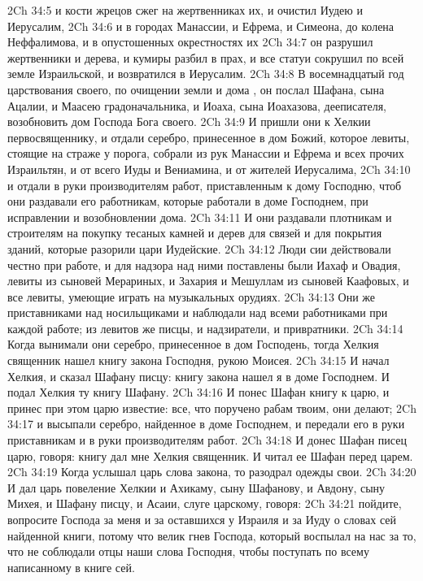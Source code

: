 \vs 2Ch 34:5 и кости жрецов сжег на жертвенниках их, и очистил Иудею и Иерусалим,
\vs 2Ch 34:6 и в городах Манассии, и Ефрема, и Симеона,  до колена Неффалимова, и в опустошенных окрестностях их
\vs 2Ch 34:7 он разрушил жертвенники и  дерева, и кумиры разбил в прах, и все статуи сокрушил по всей земле Израильской, и возвратился в Иерусалим.
\rsbpar\vs 2Ch 34:8 В восемнадцатый год царствования своего, по очищении земли и дома , он послал Шафана, сына Ацалии, и Маасею градоначальника, и Иоаха, сына Иоахазова, дееписателя, возобновить дом Господа Бога своего.
\vs 2Ch 34:9 И пришли они к Хелкии первосвященнику, и отдали серебро, принесенное в дом Божий, которое левиты, стоящие на страже у порога, собрали из рук Манассии и Ефрема и всех прочих Израильтян, и от всего Иуды и Вениамина, и от жителей Иерусалима,
\vs 2Ch 34:10 и отдали в руки производителям работ, приставленным к дому Господню, чтоб они раздавали его работникам, которые работали в доме Господнем, при исправлении и возобновлении дома.
\vs 2Ch 34:11 И они раздавали плотникам и строителям на покупку тесаных камней и дерев для связей и для покрытия зданий, которые разорили цари Иудейские.
\vs 2Ch 34:12 Люди сии действовали честно при работе, и для надзора над ними поставлены были Иахаф и Овадия, левиты из сыновей Мерариных, и Захария и Мешуллам из сыновей Каафовых, и все левиты, умеющие играть на музыкальных орудиях.
\vs 2Ch 34:13 Они же  приставниками над носильщиками и наблюдали над всеми работниками при каждой работе; из левитов же  писцы, и надзиратели, и привратники.
\rsbpar\vs 2Ch 34:14 Когда вынимали они серебро, принесенное в дом Господень, тогда Хелкия священник нашел книгу закона Господня,  рукою Моисея.
\vs 2Ch 34:15 И начал Хелкия, и сказал Шафану писцу: книгу закона нашел я в доме Господнем. И подал Хелкия ту книгу Шафану.
\vs 2Ch 34:16 И понес Шафан книгу к царю, и принес при этом царю известие: все, что поручено рабам твоим, они делают;
\vs 2Ch 34:17 и высыпали серебро, найденное в доме Господнем, и передали его в руки приставникам и в руки производителям работ.
\vs 2Ch 34:18 И  донес Шафан писец царю, говоря: книгу дал мне Хелкия священник. И читал ее Шафан перед царем.
\vs 2Ch 34:19 Когда услышал царь слова закона, то разодрал одежды свои.
\vs 2Ch 34:20 И дал царь повеление Хелкии и Ахикаму, сыну Шафанову, и Авдону, сыну Михея, и Шафану писцу, и Асаии, слуге царскому, говоря:
\vs 2Ch 34:21 пойдите, вопросите Господа за меня и за оставшихся у Израиля и за Иуду о словах сей найденной книги, потому что велик гнев Господа, который воспылал на нас за то, что не соблюдали отцы наши слова Господня, чтобы поступать по всему написанному в книге сей.
